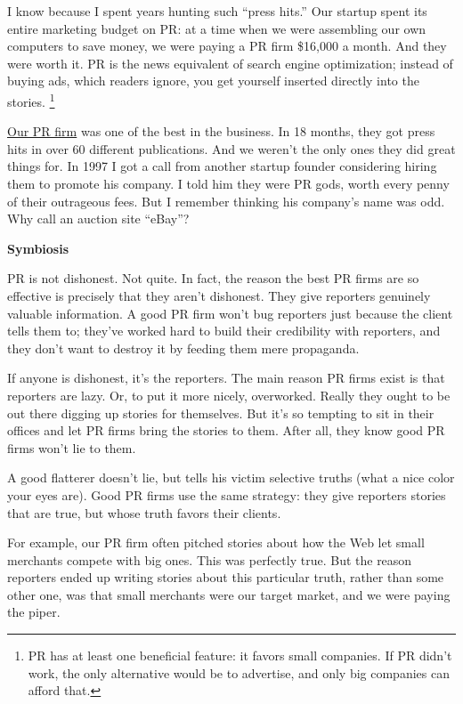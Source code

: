 \documentclass[12pt]{book}
\begin{document}
I know because I spent years hunting such ``press hits.'' Our startup
spent its entire marketing budget on PR: at a time when we were
assembling our own computers to save money, we were paying a PR firm
\$16,000 a month. And they were worth it. PR is the news equivalent of
search engine optimization; instead of buying ads, which readers ignore,
you get yourself inserted directly into the stories.
\footnote{PR has at least one beneficial feature: it favors small
companies. If PR didn't work, the only alternative would be to
advertise, and only big companies can afford that.}

\href{http://schwartz-pr.com/client_coverage.php}{Our PR firm} was one
of the best in the business. In 18 months, they got press hits in over
60 different publications. And we weren't the only ones they did great
things for. In 1997 I got a call from another startup founder
considering hiring them to promote his company. I told him they were PR
gods, worth every penny of their outrageous fees. But I remember
thinking his company's name was odd. Why call an auction site ``eBay''?

\textbf{Symbiosis}

PR is not dishonest. Not quite. In fact, the reason the best PR firms
are so effective is precisely that they aren't dishonest. They give
reporters genuinely valuable information. A good PR firm won't bug
reporters just because the client tells them to; they've worked hard to
build their credibility with reporters, and they don't want to destroy
it by feeding them mere propaganda.

If anyone is dishonest, it's the reporters. The main reason PR firms
exist is that reporters are lazy. Or, to put it more nicely, overworked.
Really they ought to be out there digging up stories for themselves. But
it's so tempting to sit in their offices and let PR firms bring the
stories to them. After all, they know good PR firms won't lie to them.

A good flatterer doesn't lie, but tells his victim selective truths
(what a nice color your eyes are). Good PR firms use the same strategy:
they give reporters stories that are true, but whose truth favors their
clients.

For example, our PR firm often pitched stories about how the Web let
small merchants compete with big ones. This was perfectly true. But the
reason reporters ended up writing stories about this particular truth,
rather than some other one, was that small merchants were our target
market, and we were paying the piper.
\end{document}
